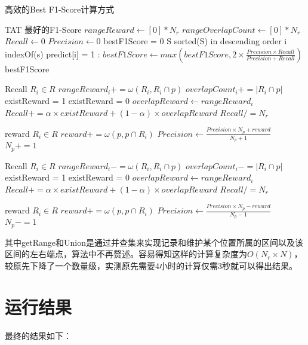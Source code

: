   \footnotesize
  \begin{breakablealgorithm}
    \caption{高效的Best F1-Score计算方式}
    \begin{algorithmic}[1]
      \Require TAT
      \Ensure 最好的F1-Score
      \State $rangeReward \gets [0] * N_r$
      \State $rangeOverlapCount \gets [0] * N_r$
      \State $Recall \gets 0$
      \State $Precision \gets 0$
      \State bestF1Score = 0
      \State S \gets sorted(S) in descending order
      \State i \gets indexOf(s)
      \State predict[i] = 1
          \State {}
          \State {}
      \EndIf
      :
          \State {}
          \State {}
      \EndIf
      \State $bestF1Score \gets max(bestF1Score, 2\times\frac{Precision \times Recall}{Precision + Recall})$
      \EndFor
      \State \Return bestF1Score
      \EndFunction

      \State Recall 
      \ForAll $R_i \in R$
            \State $rangeReward_i += \omega(R_i,R_i \cap p)$
            \State $overlapCount_i += |R_i\cap p|$
              \State existReward = 1
            \Else
              \State existReward = 0
            \EndIf
            \State $overlapReward \gets rangeReward_i$
            \State $Recall += \alpha \times existReward + (1-\alpha) \times overlapReward$
      \EndFor
      \State $Recall /= N_r$

      \State reward 
      \ForAll $R_i \in R$
            \State $reward += \omega(p, p \cap R_i)$
      \EndFor
      \State $Precision \gets \frac{Precision \times N_p + reward}{N_p + 1}$
      \State $N_p += 1$
      \EndFunction

      \State Recall 
      \ForAll $R_i \in R$
            \State $rangeReward_i -= \omega(R_i,R_i \cap p)$
            \State $overlapCount_i -= |R_i\cap p|$
              \State existReward = 1
            \Else
              \State existReward = 0
            \EndIf
            \State $overlapReward \gets rangeReward_i$
            \State $Recall += \alpha \times existReward + (1-\alpha) \times overlapReward$
      \EndFor
      \State $Recall /= N_r$

      \State reward 
      \ForAll $R_i \in R$
            \State $reward += \omega(p, p \cap R_i)$
      \EndFor
      \State $Precision \gets \frac{Precision \times N_p - reward}{N_p - 1}$
      \State $N_p -= 1$
      \EndFunction
    \end{algorithmic}
    \end{breakablealgorithm}
  
  其中getRange和Union是通过并查集来实现记录和维护某个位置所属的区间以及该区间的左右端点，算法中不再赘述。容易得知这样的计算复杂度为$O(N_r\times N)$，较原先下降了一个数量级，实测原先需要4小时的计算仅需3秒就可以得出结果。
\section{运行结果}
最终的结果如下：


